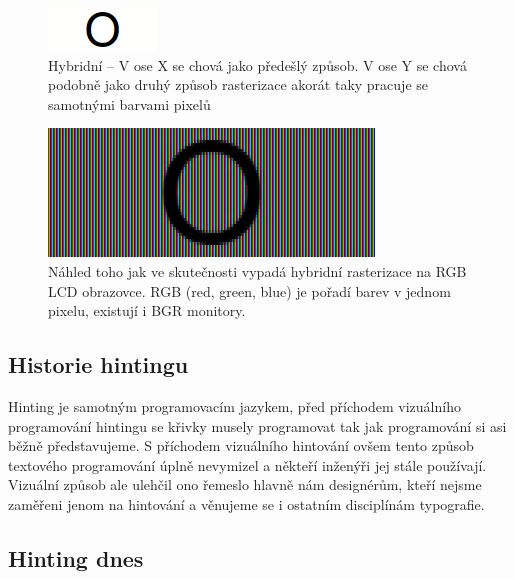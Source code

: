 \documentclass[a4paper]{article}
\begin{document}
\begin{figure}[H]
  \includegraphics[width=\linewidth]{pics/o_TT_antialiasing.png}
  \caption{Hybridní – V ose X se chová jako předešlý způsob. V ose Y se chová podobně jako druhý způsob rasterizace akorát taky pracuje se samotnými barvami pixelů}
\end{figure}

\begin{figure}[H]
  \includegraphics[width=\linewidth]{pics/o_TT_antialiasing_preview.png}
  \caption{Náhled toho jak ve skutečnosti vypadá hybridní rasterizace na RGB LCD obrazovce. RGB (red, green, blue) je pořadí barev v jednom pixelu, existují i BGR monitory.}
\end{figure}

\subsection{Historie hintingu}
Hinting je samotným programovacím jazykem, před příchodem vizuálního programování hintingu se křivky musely programovat tak jak programování si asi běžně představujeme. S příchodem vizuálního hintování ovšem tento způsob textového programování úplně nevymizel a někteří inženýři jej stále používají. Vizuální způsob ale ulehčil ono řemeslo hlavně nám designérům, kteří nejsme zaměřeni jenom na hintování a věnujeme se i ostatním disciplínám typografie. 

\subsection{Hinting dnes}
\end{document}
